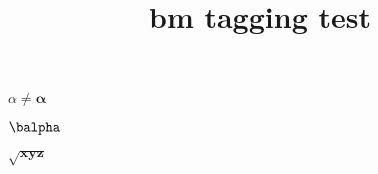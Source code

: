 \documentclass{article}
\title{bm tagging test}
\begin{document}
$\alpha \not= \bm{\alpha}$

$\balpha$

$\bm{\sqrt{xyz}}$
\end{document}

